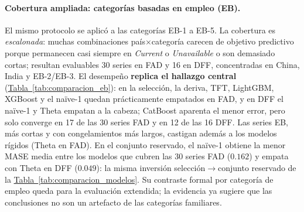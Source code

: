 \documentclass[12pt,letterpaper]{report}
\begin{document}
\paragraph{Cobertura ampliada: categorías basadas en empleo (EB).} El mismo protocolo se aplicó
a las categorías EB-1 a EB-5. La cobertura es \textit{escalonada}: muchas combinaciones
país$\times$categoría carecen de objetivo predictivo porque permanecen casi siempre en
\textit{Current} o \textit{Unavailable} o son demasiado cortas; resultan evaluables 30 series en
FAD y 16 en DFF, concentradas en China, India y EB-2/EB-3. El desempeño \textbf{replica el
hallazgo central} (\hyperref[tab:comparacion_eb]{Tabla~\ref*{tab:comparacion_eb}}): en la selección, la deriva, TFT, LightGBM,
XGBoost y el naïve-1 quedan prácticamente empatados en FAD, y en DFF el naïve-1 y Theta empatan
a la cabeza; CatBoost aparenta el menor error, pero solo converge en 17 de las 30 series FAD y en
12 de las 16 DFF. Las series EB, más cortas y con congelamientos más largos, castigan además a
los modelos rígidos (Theta en FAD). En el conjunto reservado, el naïve-1 obtiene la menor MASE
media entre los modelos que cubren las 30 series FAD ($0.162$) y empata con Theta en DFF
($0.049$): la misma inversión selección$\rightarrow$conjunto reservado de la
\hyperref[tab:comparacion_modelos]{Tabla~\ref*{tab:comparacion_modelos}}. Su contraste formal por categoría de empleo queda para la
evaluación extendida; la evidencia ya sugiere que las conclusiones no son un artefacto de las
categorías familiares.
\end{document}
